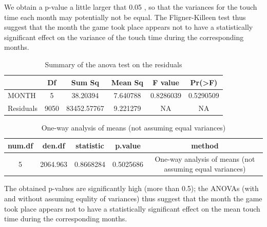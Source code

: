 \documentclass[
  11pt,
]{article}
\begin{document}
We obtain a p-value a little larger that 0.05 , so that the variances for the touch time each month may potentially not be equal. The Fligner-Killeen test thus suggest that the month the game took place appears not to have a statistically significant effect on the variance of the touch time during the corresponding months.

\pagebreak

\begin{table}[H]

\caption{\label{tab:second-test3}Summary of the anova test on the residuals}
\centering
\begin{tabular}[t]{lccccc}
\toprule
  & Df & Sum Sq & Mean Sq & F value & Pr(>F)\\
\midrule
MONTH & 5 & 38.20394 & 7.640788 & 0.8286039 & 0.5290509\\
Residuals & 9050 & 83452.57767 & 9.221279 & NA & NA\\
\bottomrule
\end{tabular}
\end{table}

\begin{table}[H]

\caption{\label{tab:second-test4}One-way analysis of means (not assuming equal variances)}
\centering
\begin{tabular}[t]{ccccc}
\toprule
num.df & den.df & statistic & p.value & method\\
\midrule
5 & 2064.963 & 0.8668284 & 0.5025686 & One-way analysis of means (not assuming equal variances)\\
\bottomrule
\end{tabular}
\end{table}

The obtained p-values are significantly high (more than 0.5); the ANOVAs (with and without assuming equlity of variances) thus suggest that the month the game took place appears not to have a statistically significant effect on the mean touch time during the corresponding months.
\end{document}
